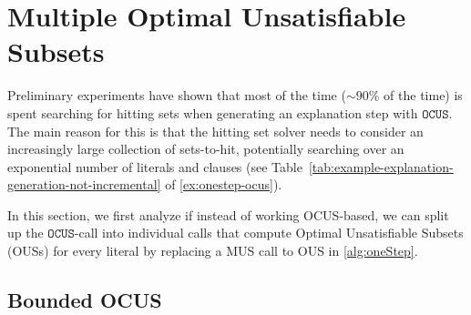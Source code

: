 \documentclass[twoside,11pt]{article}
\newcommand\comment[1]{\marginpar{\tiny #1}}
\renewcommand\comment[1]{#1}
\newcommand{\emilio}[1]{{\comment{\color{red}Emilio: #1}}}
\newcommand{\bart}[1]{{\comment{\color{OliveGreen}Bart: #1}}}
\newcommand{\newtext}[1]{{\comment{{\color{blue} #1}}}}
\newcommand\mm[1]{\ensuremath{#1}\xspace}
\newcommand\call[1]{\mm{\texttt{#1}}}
\newcommand\omus{\mm{\call{OUS}}}
\newcommand\comus{\mm{\call{OCUS}}}
\begin{document}
	

\section{Multiple Optimal Unsatisfiable Subsets}\label{sec:OUS}

Preliminary experiments have shown that most of the time ($\sim90\%$ of the time) is spent searching for hitting sets when generating an explanation step with \comus. 
The main reason for this is that the hitting set solver needs to consider an increasingly large collection of sets-to-hit, potentially searching over an exponential number of literals and clauses (see Table~\ref{tab:example-explanation-generation-not-incremental} of \cref{ex:onestep-ocus}).

In this section, we first analyze if instead of working OCUS-based, we can split up the \comus-call into individual calls that compute Optimal Unsatisfiable Subsets (OUSs) for every literal by replacing a MUS call to OUS in \cref{alg:oneStep}.

\subsection{Bounded OCUS}

\end{document}
